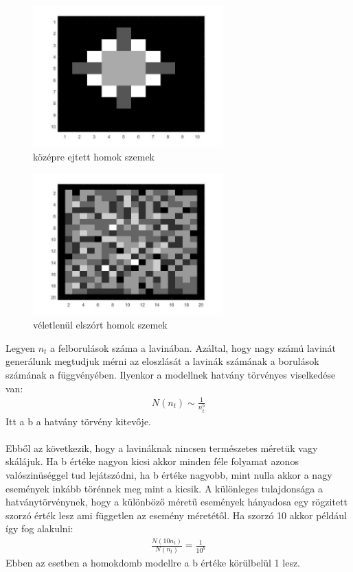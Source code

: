 \documentclass[paper=a4, fontsize=11pt]{article}
\begin{document}
\begin{figure}[H]
    \centering
    \includegraphics[width=0.65\textwidth]{homok}
    \caption{középre ejtett homok szemek}
\end{figure}










\begin{figure}[H]
    \centering
    \includegraphics[width=0.65\textwidth]{randomhomok}
    \caption{véletlenül elszórt homok szemek}
\end{figure}


Legyen $n_t$ a felborulások száma a lavinában. Azáltal, hogy nagy számú lavinát generálunk megtudjuk mérni az eloszlását a lavinák számának a borulások számának a függvényében.
\newline
Ilyenkor a modellnek hatvány törvényes viselkedése van:
\begin{align}
N(n_t)\sim \frac{1}{n_t^b}
\end{align}
Itt a b a hatvány törvény kitevője.
\\
\\
Ebből az következik, hogy a lavináknak nincsen természetes méretük vagy skálájuk. Ha b értéke nagyon kicsi akkor minden féle folyamat azonos valószinüséggel tud lejátszódni, ha b értéke nagyobb, mint nulla akkor a nagy események inkább törénnek meg mint a kicsik. A különleges tulajdonsága a hatványtörvénynek, hogy a különböző méretű események hányadosa egy rögzitett szorzó érték lesz ami független az esemény méretétől. Ha szorzó 10 akkor például így fog alakulni:
\begin{align}
\frac{N(10n_t)}{N(n_t)}=\frac{1}{10^b}
\end{align}
Ebben az esetben a homokdomb modellre a b értéke körülbelül 1 lesz.
\end{document}
